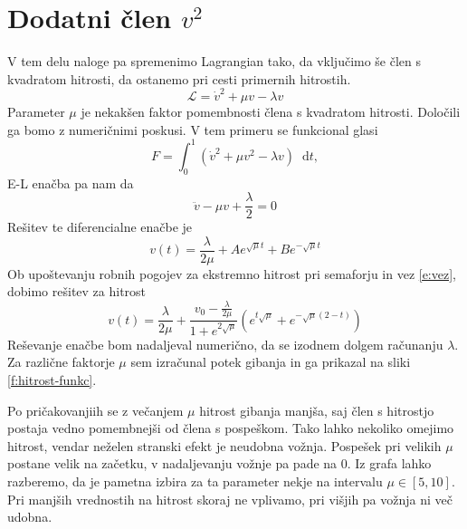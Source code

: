 \documentclass[a4paper, 12pt, slovene]{article}
\newcommand*\diff{\mathop{}\!\mathrm{d}}
\numberwithin{equation}{section}
\newcommand{\lag}{\mathcal{L}\!}
\begin{document}
\section{Dodatni člen $v^2$}
V tem delu naloge pa spremenimo Lagrangian tako, da vključimo še člen s kvadratom hitrosti, da ostanemo pri cesti primernih hitrostih.
\begin{equation}
\lag = \dot{v}^2 + \mu v - \lambda v
\end{equation}
Parameter $\mu$ je nekakšen faktor pomembnosti člena s kvadratom hitrosti. Določili ga bomo z numeričnimi poskusi. V tem primeru se funkcional glasi
\begin{equation}
F = \int_0^1(\dot{v}^2 + \mu v^2 - \lambda v)\diff t,
\end{equation}
E-L enačba pa nam da
\begin{equation}
\ddot{v} - \mu v + \frac{\lambda}{2} = 0
\end{equation}
Rešitev te diferencialne enačbe je
\begin{equation}
v(t) = \frac{\lambda}{2\mu} + Ae^{\sqrt{\mu}t} + Be^{-\sqrt{\mu}t}
\end{equation}
Ob upoštevanju robnih pogojev za ekstremno hitrost pri semaforju in vez \eqref{e:vez}, dobimo rešitev za hitrost
\begin{equation}
v(t) = \frac{\lambda}{2\mu} + \frac{v_0 - \frac{\lambda}{2\mu}}{1 + e^{2\sqrt{\mu}}} \left( e^{t\sqrt{\mu}} + e^{-\sqrt{\mu}(2-t)} \right)
\end{equation}
Reševanje enačbe bom nadaljeval numerično, da se izodnem dolgem računanju $\lambda$. Za različne faktorje $\mu$ sem izračunal potek gibanja in ga prikazal na sliki \ref{f:hitrost-funkc}. \par\vspace{5mm}

Po pričakovanjiih se z večanjem $\mu$ hitrost gibanja manjša, saj člen s hitrostjo postaja vedno pomembnejši od člena s pospeškom. Tako lahko nekoliko omejimo hitrost, vendar neželen stranski efekt je neudobna vožnja. Pospešek pri velikih $\mu$ postane velik na začetku, v nadaljevanju vožnje pa pade na 0. Iz grafa lahko razberemo, da je pametna izbira za ta parameter nekje na intervalu $\mu \in [5, 10]$. Pri manjših vrednostih na hitrost skoraj ne vplivamo, pri višjih pa vožnja ni več udobna.
\end{document}
